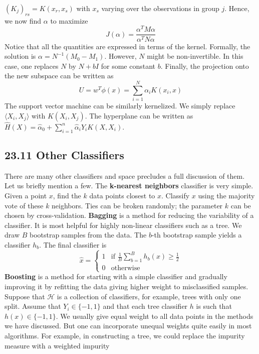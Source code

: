 \((K_{j})_{rs} = K(x_r, x_s)\) with \(x_s\) varying over the observations
in group \(j\). Hence, we now find \(\alpha\) to maximize
\[
J(\alpha) = \frac{\alpha^T M \alpha}{\alpha^T N \alpha}
\]
Notice that all the quantities are expressed in terms of the kernel.
Formally, the solution is \(\alpha = N^{-1}(M_{0} - M_{1})\). However, \(N\)
might be non-invertible. In this case, one replaces \(N\) by \(N + bI\)
for some constant \(b\). Finally, the projection onto the new subspace
can be written as
\[
U = w^T \phi(x) = \sum_{i=1}^N \alpha_{i} K(x_{i}, x)
\]
The support vector machine can be similarly kernelized. We simply
replace \(\langle X_{i}, X_{j} \rangle\) with \(K(X_{i}, X_{j})\). The
hyperplane can be written as
\(\hat{H}(X) = \hat{\alpha}_{0} + \sum_{i=1}^{n} \hat{\alpha}_{i} Y_{i} K(X, X_{i})\).

\subsection*{23.11 Other Classifiers}\label{other-classifiers}
There are many other classifiers and space precludes a full discussion
of them. Let us briefly mention a few.
The \textbf{k-nearest neighbors} classifier is very simple. Given a
point \(x\), find the \(k\) data points closest to \(x\). Classify \(x\)
using the majority vote of these \(k\) neighbors. Ties can be broken
randomly; the parameter \(k\) can be chosen by cross-validation.
\textbf{Bagging} is a method for reducing the variability of a
classifier. It is most helpful for highly non-linear classifiers such as
a tree. We draw \(B\) bootstrap samples from the data. The \(b\)-th
bootstrap sample yields a classifier \(h_b\). The final classifier is
\[
\hat{x} = \begin{cases}
1 & \text{if } \frac{1}{B} \sum_{b=1}^B h_b(x) \geq \frac{1}{2} \\
0 & \text{otherwise}
\end{cases}
\]
\textbf{Boosting} is a method for starting with a simple classifier and
gradually improving it by refitting the data giving higher weight to
misclassified samples. Suppose that \(\mathcal{H}\) is a collection of
classifiers, for example, trees with only one split. Assume that
\(Y_{i} \in \{ -1, 1 \}\) and that each tree classifier \(h\) is such that
\(h(x) \in \{ -1, 1 \}\). We usually give equal weight to all data
points in the methods we have discussed. But one can incorporate unequal
weights quite easily in most algorithms. For example, in constructing a
tree, we could replace the impurity measure with a weighted impurity
